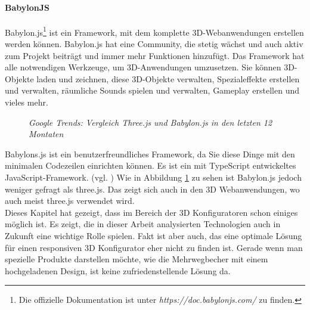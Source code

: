 \paragraph{BabylonJS}
\label{sec:babylonJS}
%
Babylon.js\footnote{Die offizielle Dokumentation ist unter \textit{https://doc.babylonjs.com/} zu finden.} ist ein Framework, mit dem komplette 3D-Webanwendungen erstellen werden können. Babylon.js hat eine Community, die stetig wächst und auch aktiv zum Projekt beiträgt und immer mehr Funktionen hinzufügt. Das Framework hat alle notwendigen Werkzeuge, um 3D-Anwendungen umzusetzen. Sie können 3D-Objekte laden und zeichnen, diese 3D-Objekte verwalten, Spezialeffekte erstellen und verwalten, räumliche Sounds spielen und verwalten, Gameplay erstellen und vieles mehr. 
%
\begin{figure}[h]
	\centering
	{}
	\caption[google Trends Statistics 3D Bibliotheken]{\textit{Google Trends: Vergleich Three.js und Babylon.js in den letzten 12 Montaten}}
	\label{fig:compare3dframework}
\end{figure}
%
Babylons.js ist ein benutzerfreundliches Framework, da Sie diese Dinge mit den minimalen Codezeilen einrichten können. Es ist ein mit TypeScript entwickeltes JavaScript-Framework. (vgl. \cite{moreau-mathis_babylon.js_2016}) Wie in Abbildung \ref{fig:compare3dframework} zu sehen ist Babylon.js jedoch weniger gefragt als three.js. Das zeigt sich auch in den 3D Webanwendungen, wo auch meist three.js verwendet wird.\\


Dieses Kapitel hat gezeigt, dass im Bereich der 3D Konfiguratoren schon einiges möglich ist. Es zeigt, die in dieser Arbeit analysierten Technologien auch in Zukunft eine wichtige Rolle spielen. Fakt ist aber auch, das eine optimale Lösung für einen responsiven 3D Konfigurator eher nicht zu finden ist. Gerade wenn man spezielle Produkte darstellen möchte, wie die Mehrwegbecher mit einem hochgeladenen Design, ist keine zufriedenstellende Lösung da.

